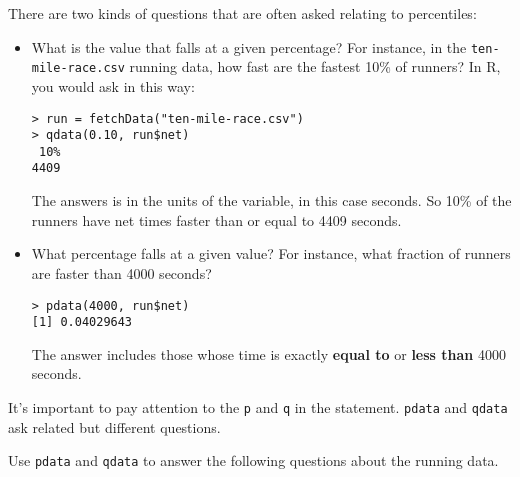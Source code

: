 There are two kinds of questions that are often asked relating to
percentiles:
\begin{itemize}

\item What is the value that falls at a given percentage?  For
  instance, in the \texttt{ten-mile-race.csv} running data, how fast are the
  fastest 10\% of runners?    In R, you would ask in this way:
\begin{verbatim}
> run = fetchData("ten-mile-race.csv")
> qdata(0.10, run$net)
 10% 
4409 
\end{verbatim}
The answers is in the units of the  variable, in this case seconds.
So 10\% of the runners have net times faster than or equal to 4409 seconds.

\item What percentage falls at a given value?  For instance, what
  fraction of runners are faster than 4000 seconds?

\begin{verbatim}
> pdata(4000, run$net)
[1] 0.04029643
\end{verbatim}
The answer includes those whose  time is exactly {\bf equal to} or
{\bf less than} 4000 seconds.

\end{itemize}

It's important to pay attention to the \texttt{p} and \texttt{q} in
the statement.  \texttt{pdata} and \texttt{qdata} ask related but
different questions.

\bigskip

\bigskip

Use \texttt{pdata} and \texttt{qdata} to answer the following
questions about the running data.

